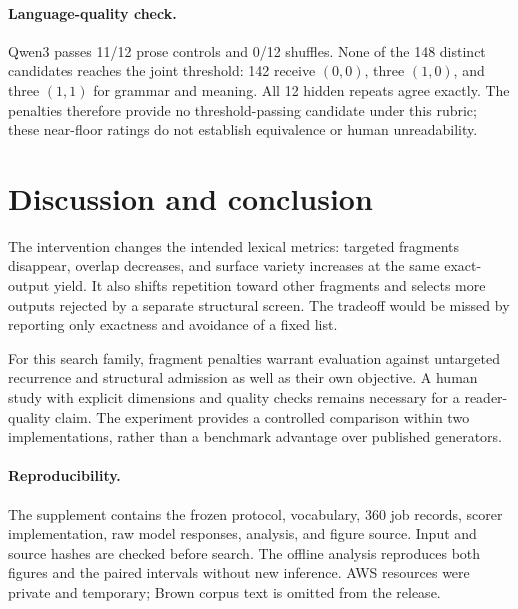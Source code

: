 \documentclass[11pt]{article}
\begin{document}
\paragraph{Language-quality check.}
Qwen3 passes 11/12 prose controls and 0/12 shuffles. None of the 148 distinct candidates reaches the joint threshold: 142 receive $(0,0)$, three $(1,0)$, and three $(1,1)$ for grammar and meaning. All 12 hidden repeats agree exactly. The penalties therefore provide no threshold-passing candidate under this rubric; these near-floor ratings do not establish equivalence or human unreadability.

\section{Discussion and conclusion}
The intervention changes the intended lexical metrics: targeted fragments disappear, overlap decreases, and surface variety increases at the same exact-output yield. It also shifts repetition toward other fragments and selects more outputs rejected by a separate structural screen. The tradeoff would be missed by reporting only exactness and avoidance of a fixed list.

For this search family, fragment penalties warrant evaluation against untargeted recurrence and structural admission as well as their own objective. A human study with explicit dimensions and quality checks \citep{khashabi-etal-2022-genie} remains necessary for a reader-quality claim. The experiment provides a controlled comparison within two implementations, rather than a benchmark advantage over published generators.

\paragraph{Reproducibility.}
The supplement contains the frozen protocol, vocabulary, 360 job records, scorer implementation, raw model responses, analysis, and figure source. Input and source hashes are checked before search. The offline analysis reproduces both figures and the paired intervals without new inference. AWS resources were private and temporary; Brown corpus text is omitted from the release.
\end{document}
